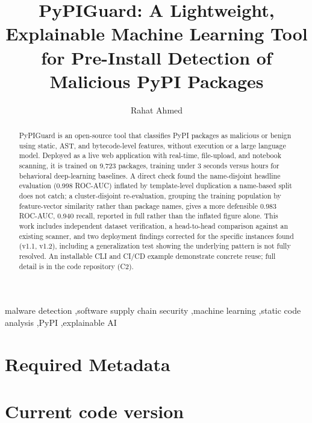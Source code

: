 \documentclass[preprint,12pt, a4paper]{elsarticle}
\begin{document}
\renewcommand{\labelenumii}{\arabic{enumi}.\arabic{enumii}}

\begin{frontmatter}

\title{PyPIGuard: A Lightweight, Explainable Machine Learning Tool for Pre-Install Detection of Malicious PyPI Packages}

\author{Rahat Ahmed}
\address{Department of Computer Science and Engineering, BRAC University, Dhaka, Bangladesh}

\begin{abstract}
PyPIGuard is an open-source tool that classifies PyPI packages as malicious or benign using static, AST, and bytecode-level features, without execution or a large language model. Deployed as a live web application with real-time, file-upload, and notebook scanning, it is trained on 9,723 packages, training under 3 seconds versus hours for behavioral deep-learning baselines. A direct check found the name-disjoint headline evaluation (0.998 ROC-AUC) inflated by template-level duplication a name-based split does not catch; a cluster-disjoint re-evaluation, grouping the training population by feature-vector similarity rather than package names, gives a more defensible 0.983 ROC-AUC, 0.940 recall, reported in full rather than the inflated figure alone. This work includes independent dataset verification, a head-to-head comparison against an existing scanner, and two deployment findings corrected for the specific instances found (v1.1, v1.2), including a generalization test showing the underlying pattern is not fully resolved. An installable CLI and CI/CD example demonstrate concrete reuse; full detail is in the code repository (C2).
\end{abstract}

\begin{keyword}
malware detection \sep software supply chain security \sep machine learning \sep static code analysis \sep PyPI \sep explainable AI
\end{keyword}

\end{frontmatter}

\section*{Required Metadata}
\label{}

\section*{Current code version}
\label{}
\end{document}
